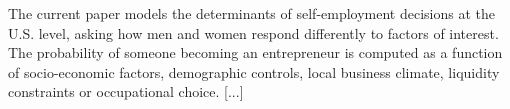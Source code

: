 The current paper models the determinants of self-employment decisions at the U.S. level, asking how men and women respond differently to factors of interest. The probability of someone becoming an entrepreneur is computed as a function of  socio-economic factors, demographic controls, local business climate, liquidity constraints or occupational choice. [...] 